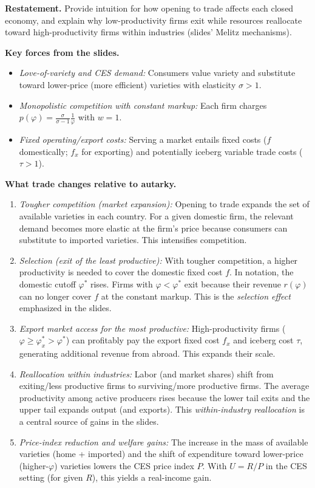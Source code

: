 \begin{solution}
	\textbf{Restatement.} Provide intuition for how opening to trade affects each closed economy, and explain why low-productivity firms exit while resources reallocate toward high-productivity firms within industries (slides’ Melitz mechanisms).

\bigskip
	\textbf{Key forces from the slides.}
\begin{itemize}
	\item \emph{Love-of-variety and CES demand:} Consumers value variety and substitute toward lower-price (more efficient) varieties with elasticity $\sigma>1$.
	\item \emph{Monopolistic competition with constant markup:} Each firm charges $p(\varphi)=\tfrac{\sigma}{\sigma-1}\tfrac{1}{\varphi}$ with $w=1$.
	\item \emph{Fixed operating/export costs:} Serving a market entails fixed costs ($f$ domestically; $f_x$ for exporting) and potentially iceberg variable trade costs ($\tau>1$).
\end{itemize}

\bigskip
	\textbf{What trade changes relative to autarky.}
\begin{enumerate}
	\item \emph{Tougher competition (market expansion):} Opening to trade expands the set of available varieties in each country. For a given domestic firm, the relevant demand becomes more elastic at the firm’s price because consumers can substitute to imported varieties. This intensifies competition.
	\item \emph{Selection (exit of the least productive):} With tougher competition, a higher productivity is needed to cover the domestic fixed cost $f$. In notation, the domestic cutoff $\varphi^*$ rises. Firms with $\varphi<\varphi^*$ exit because their revenue $r(\varphi)$ can no longer cover $f$ at the constant markup. This is the \emph{selection effect} emphasized in the slides.
	\item \emph{Export market access for the most productive:} High-productivity firms ($\varphi\ge \varphi_x^*>\varphi^*$) can profitably pay the export fixed cost $f_x$ and iceberg cost $\tau$, generating additional revenue from abroad. This expands their scale.
	\item \emph{Reallocation within industries:} Labor (and market shares) shift from exiting/less productive firms to surviving/more productive firms. The average productivity among active producers rises because the lower tail exits and the upper tail expands output (and exports). This \emph{within-industry reallocation} is a central source of gains in the slides.
	\item \emph{Price-index reduction and welfare gains:} The increase in the mass of available varieties (home + imported) and the shift of expenditure toward lower-price (higher-$\varphi$) varieties lowers the CES price index $P$. With $U=R/P$ in the CES setting (for given $R$), this yields a real-income gain.
\end{enumerate}


\end{solution}

